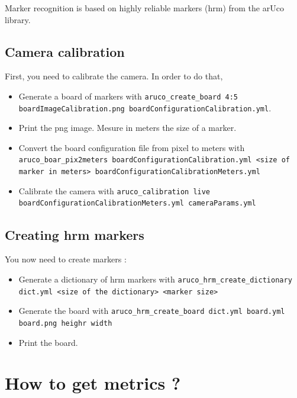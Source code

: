 \documentclass[a4paper,11pt]{report}
\begin{document}
Marker recognition is based on highly reliable markers (hrm) from the arUco
library.

\subsection{Camera calibration}

First, you need to calibrate the camera. In order to do that, \begin{itemize}

    \item Generate a board of markers with \texttt{aruco\_create\_board 4:5
        boardImageCalibration.png boardConfigurationCalibration.yml}.

    \item Print the png image. Mesure in meters the size of a marker.

    \item Convert the board configuration file from pixel to meters with
        \texttt{aruco\_boar\_pix2meters boardConfigurationCalibration.yml <size
        of marker in meters> boardConfigurationCalibrationMeters.yml}

    \item Calibrate the camera with \texttt{aruco\_calibration live
        boardConfigurationCalibrationMeters.yml cameraParams.yml}

\end{itemize}

\subsection{Creating hrm markers}

You now need to create markers : \begin{itemize}

    \item Generate a dictionary of hrm markers with
        \texttt{aruco\_hrm\_create\_dictionary dict.yml <size of the
        dictionary> <marker size>}

    \item Generate the board with \texttt{aruco\_hrm\_create\_board dict.yml
        board.yml board.png heighr width}

    \item Print the board.

\end{itemize}



\section{How to get metrics ?}
\end{document}
